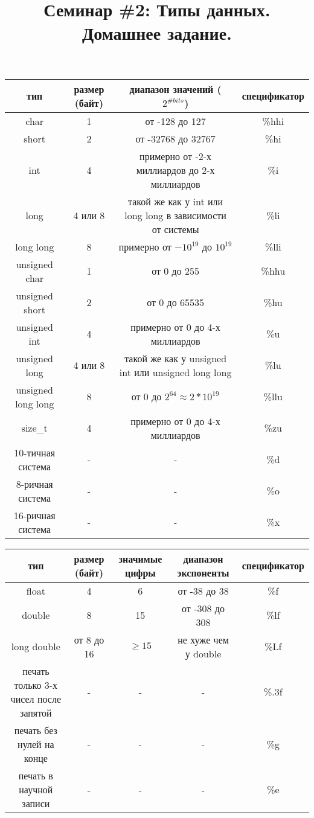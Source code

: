 \documentclass{article}
\begin{document}
\title{Семинар \#2: Типы данных. Домашнее задание. \vspace{-5ex}}\date{}\maketitle
\begin{center}
\begin{tabular}{ c c c c }
 тип & размер (байт) & диапазон значений ($2^{\# bits}$) & спецификатор \\ \hline
 char & 1 & от -128 до 127 & \%hhi \\ 
 short & 2 & от -32768 до 32767 & \%hi  \\  
 int & 4 & примерно от -2-х миллиардов до 2-х миллиардов & \%i  \\  
 long & 4 или 8 & такой же как у int или long long в зависимости от системы & \%li  \\  
 long long & 8 & примерно от $-10^{19}$ до $10^{19}$ & \%lli  \\  
 unsigned char & 1 & от 0 до 255 & \%hhu \\ 
 unsigned short & 2 & от 0 до 65535 & \%hu  \\  
 unsigned int & 4 & примерно от 0 до 4-х миллиардов & \%u  \\  
 unsigned long & 4 или 8 & такой же как у unsigned int или unsigned long long & \%lu  \\  
 unsigned long long & 8 & от 0 до $2^{64} \approx 2*10^{19}$  & \%llu  \\  
 size\_t & 4 & примерно от 0 до 4-х миллиардов & \%zu \\ \hline
 10-тичная система & - & - & \%d \\
 8-ричная система & - & - & \%o \\
 16-ричная система & - & - & \%x  \\ \hline
\end{tabular}
\end{center}

\begin{center}
\begin{tabular}{ c c c c c }
 тип & размер (байт) & значимые цифры & диапазон экспоненты & спецификатор \\ \hline
 float             & 4          & 6  & от -38 до 38    & \%f \\ 
 double            & 8          & 15 & от -308 до 308  & \%lf  \\  
 long double       & от 8 до 16 & $\ge 15$  & не хуже чем у double  & \%Lf  \\ \hline
 печать только 3-х чисел после запятой & -          & -  & -              & \%.3f \\
 печать без нулей на конце & -          & -  & -              & \%g \\
 печать в научной записи   & -          & -  & -              & \%e \\\hline
\end{tabular}
\end{center}
\end{document}
